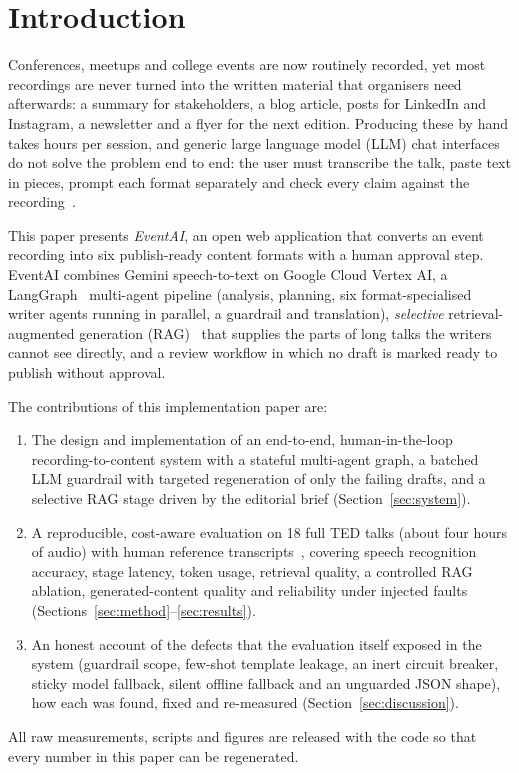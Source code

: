 \section{Introduction}
Conferences, meetups and college events are now routinely recorded, yet most recordings are
never turned into the written material that organisers need afterwards: a summary for
stakeholders, a blog article, posts for LinkedIn and Instagram, a newsletter and a flyer for
the next edition. Producing these by hand takes hours per session, and generic large language
model (LLM) chat interfaces do not solve the problem end to end: the user must transcribe the
talk, paste text in pieces, prompt each format separately and check every claim against the
recording~\cite{ji2023hallucination}.

This paper presents \emph{EventAI}, an open web application that converts an event recording
into six publish-ready content formats with a human approval step. EventAI combines Gemini
speech-to-text on Google Cloud Vertex AI, a LangGraph~\cite{langgraph} multi-agent pipeline
(analysis, planning, six format-specialised writer agents running in parallel, a guardrail
and translation), \emph{selective} retrieval-augmented generation (RAG)~\cite{lewis2020rag}
that supplies the parts of long talks the writers cannot see directly, and a review workflow
in which no draft is marked ready to publish without approval.

The contributions of this implementation paper are:
\begin{enumerate}
  \item The design and implementation of an end-to-end, human-in-the-loop recording-to-content
        system with a stateful multi-agent graph, a batched LLM guardrail with targeted
        regeneration of only the failing drafts, and a selective RAG stage driven by the
        editorial brief (Section~\ref{sec:system}).
  \item A reproducible, cost-aware evaluation on 18 full TED talks (about four hours of audio)
        with human reference transcripts~\cite{hernandez2018tedlium}, covering speech
        recognition accuracy, stage latency, token usage, retrieval quality, a controlled RAG
        ablation, generated-content quality and reliability under injected faults
        (Sections~\ref{sec:method}--\ref{sec:results}).
  \item An honest account of the defects that the evaluation itself exposed in the system
        (guardrail scope, few-shot template leakage, an inert circuit breaker, sticky model
        fallback, silent offline fallback and an unguarded JSON shape), how each was found,
        fixed and re-measured (Section~\ref{sec:discussion}).
\end{enumerate}
All raw measurements, scripts and figures are released with the code so that every number
in this paper can be regenerated.
